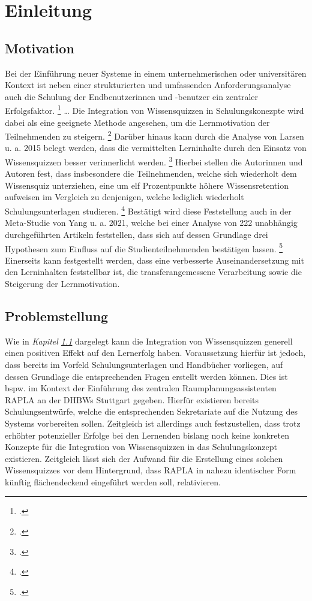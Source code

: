 \chapter{Einleitung}
\section{Motivation}\label{sec:motivation}
Bei der Einführung neuer Systeme in einem unternehmerischen oder universitären
Kontext ist neben einer strukturierten und umfassenden Anforderungsanalyse
auch
die Schulung der Endbenutzerinnen und -benutzer ein zentraler Erfolgsfaktor.
\footcite[Vgl.][S. 189 ff.]{leeEmpiricalStudyRelationships1995}
\dots
Die Integration von Wissensquizzen in Schulungskonezpte wird dabei
als eine geeignete Methode angesehen, um die Lernmotivation der Teilnehmenden zu steigern.
\footcites[Vgl.][83]{huangEmpoweringEndUsers1998}[1080]{maurerEQuizSimpleTool2007}[147]{paaERPEndUserTrainingELearning2014}
Darüber hinaus kann durch die Analyse von Larsen u. a. 2015 belegt werden, dass
die vermittelten Lerninhalte durch den Einsatz von Wissensquizzen besser verinnerlicht werden.
\footcite[Vgl.][S. 748 ff.]{larsenEffectsTestenhancedLearning2015}
Hierbei stellen die Autorinnen und Autoren fest, dass insbesondere die Teilnehmenden, welche
sich wiederholt dem Wissensquiz unterziehen, eine um elf Prozentpunkte höhere Wissensretention
aufweisen im Vergleich zu denjenigen, welche lediglich wiederholt Schulungsunterlagen studieren.
\footcite[Vgl.][748]{larsenEffectsTestenhancedLearning2015}
Bestätigt wird diese Feststellung auch in der Meta-Studie von Yang u. a. 2021, welche bei
einer Analyse von 222 unabhängig durchgeführten Artikeln feststellen, dass sich
auf dessen Grundlage drei Hypothesen zum Einfluss auf die Studienteilnehmenden bestätigen lassen.
\footcite[Vgl.][399]{yangTestingQuizzingBoosts2021}
Einerseits kann festgestellt werden, 
dass eine verbesserte Auseinandersetzung mit den Lerninhalten feststellbar ist, die
transferangemessene
Verarbeitung sowie die Steigerung der Lernmotivation.
\section{Problemstellung}
Wie in \textit{Kapitel \ref{sec:motivation}} dargelegt kann die Integration von Wissensquizzen
generell einen positiven Effekt auf den Lernerfolg haben. Voraussetzung hierfür ist jedoch, dass
bereits im Vorfeld Schulungsunterlagen und Handbücher vorliegen, auf dessen Grundlage
die entsprechenden Fragen erstellt werden können. Dies ist bspw. im Kontext
der Einführung des zentralen Raumplanungsassistenten \ac{RAPLA} an der \acp{DHBW} Stuttgart
gegeben. Hierfür existieren bereits Schulungsentwürfe, welche
die entsprechenden Sekretariate auf die Nutzung des Systems vorbereiten sollen.
Zeitgleich ist allerdings auch festzustellen, dass trotz
erhöhter potenzieller Erfolge bei den Lernenden bislang noch keine
konkreten Konzepte für die Integration von Wissensquizzen in das Schulungskonzept
existieren.
Zeitgleich lässt sich der Aufwand für die Erstellung eines solchen
Wissensquizzes vor dem Hintergrund, dass \ac{RAPLA} in nahezu
identischer Form künftig flächendeckend
eingeführt werden soll, relativieren.


